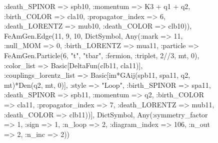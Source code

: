 \documentclass{revtex4}
\begin{document}
\begin{figure}[!htb]
\begin{center}
{:death_SPINOR => spb10, :momentum => K3 + q1 + q2, :birth_COLOR => cla10, :propagator_index => 6, :death_LORENTZ => mub10, :death_COLOR => clb10)), FeAmGen.Edge(11, 9, 10, Dict{Symbol, Any}(:mark => 11, :null_MOM => 0, :birth_LORENTZ => mua11, :particle => FeAmGen.Particle(6, "t", "tbar", :fermion, :triplet, 2//3, mt, 0), :color_list => Basic[DeltaFun(clb11, cla11)], :couplings_lorentz_list => Basic[im*GAij(spb11, spa11, q2, mt)*Den(q2, mt, 0)], :style => "Loop", :birth_SPINOR => spa11, :death_SPINOR => spb11, :momentum => q2, :birth_COLOR => cla11, :propagator_index => 7, :death_LORENTZ => mub11, :death_COLOR => clb11))], Dict{Symbol, Any}(:symmetry_factor => 1, :sign => 1, :n_loop => 2, :diagram_index => 106, :n_out => 2, :n_inc => 2)) 
}
\end{center}
\end{figure}
\end{document}
